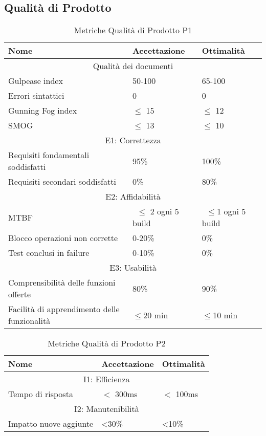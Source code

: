 \subsection{Qualità di Prodotto}
\begin{table}[!htpb]
	\centering
	\renewcommand{\arraystretch}{2} 
	\begin{tabular}{|p{8cm}|p{3.5cm}|p{3.5cm}|}
		\rowcolor{orange!50}
		\hline
		\textbf{Nome} & \textbf{Accettazione} & \textbf{Ottimalità} \\ 
		\hline
	    \multicolumn{3}{|c|}{Qualità dei documenti} \\
		\hline
		Gulpease index & 50-100 & 65-100 \\ \hline
		Errori sintattici & 0 & 0 \\ \hline
		Gunning Fog index & $\leq$ 15 & $\leq$ 12 \\ \hline
		SMOG & $\leq$ 13 & $\leq$ 10  \\ 
		\hline
		\multicolumn{3}{|c|}{E1: Correttezza}\\
		\hline
		Requisiti fondamentali soddisfatti & 95\% & 100\% \\ \hline
		Requisiti secondari soddisfatti & 0\% & 80\% \\ \hline
	    \multicolumn{3}{|c|}{E2: Affidabilità} \\
		\hline
		MTBF & \ $\leq$ 2 ogni 5 build & \ $\leq$1  ogni 5 build \\ \hline
		Blocco operazioni non corrette & 0-20\% & 0\% \\ \hline
		Test conclusi in failure & 0-10\% & 0\% \\ \hline
	    \multicolumn{3}{|c|}{E3: Usabilità} \\
		\hline
			Comprensibilità delle funzioni offerte        &           80\%            &      90\%         \\
			\hline
			Facilità di apprendimento delle funzionalità & $\leq$20 min & $\leq$10  min \\   \hline  
	\end{tabular}
	\caption{Metriche Qualità di Prodotto P1}
\end{table}	        
\begin{table}[!htpb]
	\centering
	\renewcommand{\arraystretch}{2} 
	\begin{tabular}{|p{8cm}|p{3.5cm}|p{3.5cm}|}
		\rowcolor{orange!50}
		\hline
		\textbf{Nome} & \textbf{Accettazione} & \textbf{Ottimalità} \\ 
		\hline
        \multicolumn{3}{|c|}{I1: Efficienza} \\
		\hline
		Tempo di risposta & $<$ 300ms & $<$ 100ms \\ \hline 
	    \multicolumn{3}{|c|}{I2: Manutenibilità} \\
		\hline
		Impatto nuove aggiunte & <30\% & <10\% \\ \hline 
	\end{tabular}
	\caption{Metriche Qualità di Prodotto P2}
\end{table}